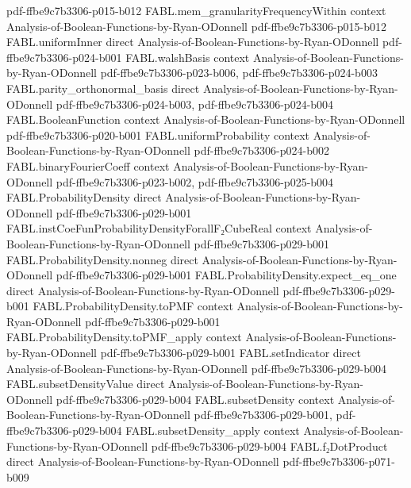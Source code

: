 \begin{theorem}
  {pdf-ffbe9c7b3306-p015-b012}
\proofstep
  {FABL.mem_granularityFrequencyWithin}
  {context}
  {Analysis-of-Boolean-Functions-by-Ryan-ODonnell}
  {pdf-ffbe9c7b3306-p015-b012}
\proofstep
  {FABL.uniformInner}
  {direct}
  {Analysis-of-Boolean-Functions-by-Ryan-ODonnell}
  {pdf-ffbe9c7b3306-p024-b001}
\proofstep
  {FABL.walshBasis}
  {context}
  {Analysis-of-Boolean-Functions-by-Ryan-ODonnell}
  {pdf-ffbe9c7b3306-p023-b006,
    pdf-ffbe9c7b3306-p024-b003}
\proofstep
  {FABL.parity_orthonormal_basis}
  {direct}
  {Analysis-of-Boolean-Functions-by-Ryan-ODonnell}
  {pdf-ffbe9c7b3306-p024-b003,
    pdf-ffbe9c7b3306-p024-b004}
\proofstep
  {FABL.BooleanFunction}
  {context}
  {Analysis-of-Boolean-Functions-by-Ryan-ODonnell}
  {pdf-ffbe9c7b3306-p020-b001}
\proofstep
  {FABL.uniformProbability}
  {context}
  {Analysis-of-Boolean-Functions-by-Ryan-ODonnell}
  {pdf-ffbe9c7b3306-p024-b002}
\proofstep
  {FABL.binaryFourierCoeff}
  {context}
  {Analysis-of-Boolean-Functions-by-Ryan-ODonnell}
  {pdf-ffbe9c7b3306-p023-b002,
    pdf-ffbe9c7b3306-p025-b004}
\proofstep
  {FABL.ProbabilityDensity}
  {direct}
  {Analysis-of-Boolean-Functions-by-Ryan-ODonnell}
  {pdf-ffbe9c7b3306-p029-b001}
\proofstep
  {FABL.instCoeFunProbabilityDensityForallF₂CubeReal}
  {context}
  {Analysis-of-Boolean-Functions-by-Ryan-ODonnell}
  {pdf-ffbe9c7b3306-p029-b001}
\proofstep
  {FABL.ProbabilityDensity.nonneg}
  {direct}
  {Analysis-of-Boolean-Functions-by-Ryan-ODonnell}
  {pdf-ffbe9c7b3306-p029-b001}
\proofstep
  {FABL.ProbabilityDensity.expect_eq_one}
  {direct}
  {Analysis-of-Boolean-Functions-by-Ryan-ODonnell}
  {pdf-ffbe9c7b3306-p029-b001}
\proofstep
  {FABL.ProbabilityDensity.toPMF}
  {context}
  {Analysis-of-Boolean-Functions-by-Ryan-ODonnell}
  {pdf-ffbe9c7b3306-p029-b001}
\proofstep
  {FABL.ProbabilityDensity.toPMF_apply}
  {context}
  {Analysis-of-Boolean-Functions-by-Ryan-ODonnell}
  {pdf-ffbe9c7b3306-p029-b001}
\proofstep
  {FABL.setIndicator}
  {direct}
  {Analysis-of-Boolean-Functions-by-Ryan-ODonnell}
  {pdf-ffbe9c7b3306-p029-b004}
\proofstep
  {FABL.subsetDensityValue}
  {direct}
  {Analysis-of-Boolean-Functions-by-Ryan-ODonnell}
  {pdf-ffbe9c7b3306-p029-b004}
\proofstep
  {FABL.subsetDensity}
  {context}
  {Analysis-of-Boolean-Functions-by-Ryan-ODonnell}
  {pdf-ffbe9c7b3306-p029-b001,
    pdf-ffbe9c7b3306-p029-b004}
\proofstep
  {FABL.subsetDensity_apply}
  {context}
  {Analysis-of-Boolean-Functions-by-Ryan-ODonnell}
  {pdf-ffbe9c7b3306-p029-b004}
\proofstep
  {FABL.f₂DotProduct}
  {direct}
  {Analysis-of-Boolean-Functions-by-Ryan-ODonnell}
  {pdf-ffbe9c7b3306-p071-b009}
\proofstep

\end{theorem}
